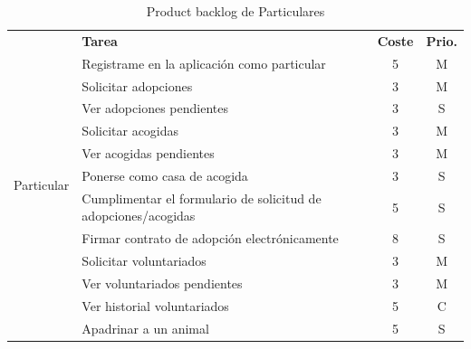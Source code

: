 \begin{table}[H]
    \centering
    \begin{tabular}{|c |p{8cm}|c |c|} \hline 
         \multirow[c]{14}{*}{Particular}&  \textbf{Tarea}&  \textbf{Coste}& \textbf{Prio.}\\  \cline{2-4}
         &  Registrame en la aplicación como particular&  5& M\\ \cline{2-4} 
         

         &  Solicitar adopciones&  3& M\\ \cline{2-4}
         &  Ver adopciones pendientes&  3& S\\ \cline{2-4}
         
         &  Solicitar acogidas&  3& M\\ \cline{2-4} 
         &  Ver acogidas pendientes&  3& M\\ \cline{2-4}
       
         &  Ponerse como casa de acogida&  3& S\\ \cline{2-4}
         
         &  Cumplimentar el formulario de solicitud de adopciones/acogidas &  5& S\\ \cline{2-4}
		 &  Firmar contrato de adopción electrónicamente&  8& S\\ \cline{2-4}
		 
		 
         &  Solicitar voluntariados&  3& M\\ \cline{2-4} 
         &  Ver voluntariados pendientes&  3& M\\ \cline{2-4}
         &  Ver historial voluntariados&  5& C\\ \cline{2-4}
         
         
         & Apadrinar a un animal&  5& S\\ \hline
         
         
         
    \end{tabular}
    \caption{Product backlog de Particulares}
    \label{tab:pb_particulares}
\end{table}

